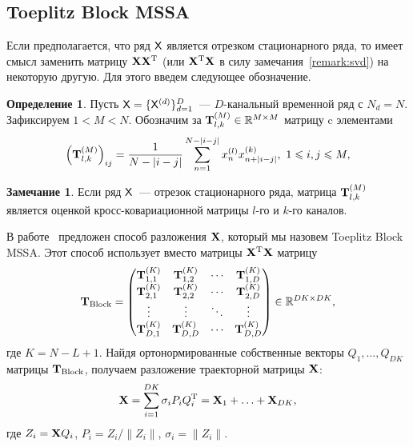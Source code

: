 \documentclass[specialist,
substylefile = spbu_report.rtx,
subf,href,colorlinks=true, 12pt]{disser}
\theoremstyle{definition}
\newtheorem{definition}{Определение}
\newtheorem{remark}{Замечание}
\newcommand{\R}{\mathbb{R}}
\begin{document}
\subsection{Toeplitz Block MSSA}\label{sect:block}
Если предполагается, что ряд $\mathsf{X}$ является отрезком стационарного ряда, то имеет смысл заменить матрицу $\mathbf{X}\mathbf{X}^{\mathrm{T}}$ (или $\mathbf{X}^{\mathrm{T}}\mathbf{X}$ в силу замечания~\ref{remark:svd}) на некоторую другую. Для этого введем следующее обозначение.
\begin{definition}
	Пусть $\mathsf{X}=\{\mathsf{X}^{(d)}\}_{d=1}^D$~--- $D$-канальный временной ряд с $N_d=N$. Зафиксируем $1<M<N$. Обозначим за $\bfT_{l,k}^{(M)}\in \R^{M\times M}$ матрицу c элементами
	\begin{equation*}\label{eq:block_elements}
		\left(\mathbf{T}^{(M)}_{l,k}\right)_{ij}=\frac{1}{N-|i-j|}\sum_{n=1}^{N-|i-j|} x^{(l)}_nx^{(k)}_{n+|i-j|},\ 1\leqslant i,j\leqslant M,
	\end{equation*}
\end{definition}
\begin{remark}
	Если ряд $\mathsf{X}$~--- отрезок стационарного ряда, матрица $\mathbf{T}_{l,k}^{(M)}$ является оценкой кросс-ковариационной матрицы $l$-го и $k$-го каналов.
\end{remark}
В работе~\cite{Plaut1994} предложен способ разложения $\mathbf{X}$, который мы назовем Toeplitz Block MSSA. Этот способ использует вместо матрицы $\mathbf{X}^{\mathrm{T}}\mathbf{X}$ матрицу $$\bfT_{\text{Block}}=\begin{pmatrix}
	\bfT^{(K)}_{1,1} & \bfT^{(K)}_{1,2} & \cdots & \bfT^{(K)}_{1,D} \\
	\bfT^{(K)}_{2,1} & \bfT^{(K)}_{2,2} & \cdots & \bfT^{(K)}_{2,D} \\
	\vdots           & \vdots           & \ddots & \vdots           \\
	\bfT^{(K)}_{D,1} & \bfT^{(K)}_{D,D} & \cdots & \bfT^{(K)}_{D,D}
\end{pmatrix} \in \R^{DK\times DK},$$ где $K = N - L + 1$. Найдя ортонормированные собственные векторы $Q_1,\ldots,Q_{DK}$ матрицы $\mathbf{T}_\text{Block}$, получаем разложение траекторной матрицы $\mathbf{X}$:
\begin{equation}\label{eq:block_decomposition}
	\mathbf{X}=\sum_{i=1}^{DK} \sigma_i P_i Q_i^{\mathrm{T}}=\mathbf{X}_1+\ldots+\mathbf{X}_{DK},
\end{equation}
где $Z_i=\mathbf{X} Q_i$, $P_i=Z_i/\|Z_i\|$, $\sigma_i=\|Z_i\|$.
\end{document}
